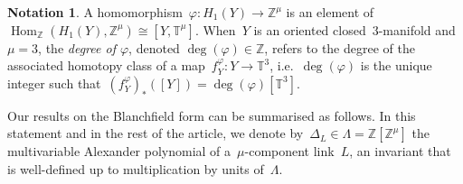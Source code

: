 \documentclass[10.9pt,a4paper]{amsart}
\theoremstyle{definition}
\newtheorem{notation}[theorem]{Notation}
\theoremstyle{remark}
\newcommand{\Z}{\mathbb{Z}}
\newcommand{\bbT}{\mathbb{T}}
\newcommand{\Hom}{\operatorname{Hom}}
\begin{document}
\begin{notation}
A homomorphism~$\varphi \colon H_1(Y) \to \Z^\mu$ is an element of~$\Hom_\Z(H_1(Y),\Z^\mu) \cong [Y,\mathbb{T}^\mu]$.
When~$Y$ is an oriented closed~$3$-manifold and~$\mu=3$,  the \emph{degree of $\varphi$}, denoted $\deg(\varphi)\in \Z$, refers to the degree of the associated homotopy class of a map~$f_Y^\varphi \colon Y\to\mathbb{T}^3$,  i.e.~$\deg(\varphi)$ is the unique integer such that~$(f_Y^\varphi)_*([Y])=\deg(\varphi)[\bbT^3]$.
\end{notation}

Our results on the Blanchfield form can be summarised as follows.
In this statement and in the rest of the article, we denote by~$\Delta_L\in\Lambda=\Z[\Z^\mu]$ the multivariable Alexander
polynomial of a~$\mu$-component link~$L$, an invariant that is well-defined up to multiplication by units of~$\Lambda$.
\end{document}
